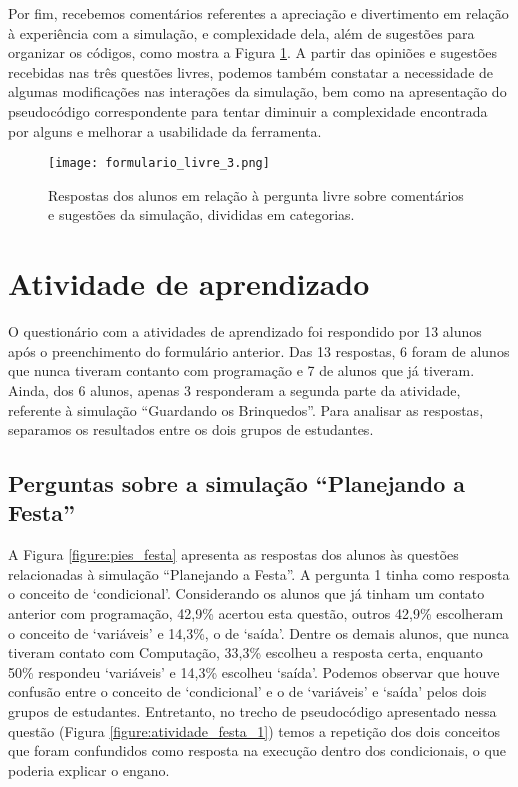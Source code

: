 Por fim, recebemos comentários referentes a apreciação e divertimento em relação à experiência com a simulação, e complexidade dela, além de sugestões para organizar os códigos, como mostra a Figura \ref{figure:livre_3}. A partir das opiniões e sugestões recebidas nas três questões livres, podemos também constatar a necessidade de algumas modificações nas interações da simulação, bem como na apresentação do pseudocódigo correspondente para tentar diminuir a complexidade encontrada por alguns e melhorar a usabilidade da ferramenta.

\begin{figure}[h!]
    \centering
    \texttt{[image: formulario\_livre\_3.png]}
    \caption{Respostas dos alunos em relação à pergunta livre sobre comentários e sugestões da simulação, divididas em categorias.}
    \label{figure:livre_3}
\end{figure}

\section{Atividade de aprendizado}

O questionário com a atividades de aprendizado foi respondido por 13 alunos após o preenchimento do formulário anterior. Das 13 respostas, 6 foram de alunos que nunca tiveram contanto com programação e 7 de alunos que já tiveram. Ainda, dos 6 alunos, apenas 3 responderam a segunda parte da atividade, referente à simulação \enquote{Guardando os Brinquedos}. Para analisar as respostas, separamos os resultados entre os dois grupos de estudantes.

\subsection{Perguntas sobre a simulação \enquote{Planejando a Festa}}

A Figura \ref{figure:pies_festa} apresenta as respostas dos alunos às questões relacionadas à simulação \enquote{Planejando a Festa}. A pergunta 1 tinha como resposta o conceito de \enquote*{condicional}. Considerando os alunos que já tinham um contato anterior com programação, 42,9\% acertou esta questão, outros 42,9\% escolheram o conceito de \enquote*{variáveis} e 14,3\%, o de \enquote*{saída}. Dentre os demais alunos, que nunca tiveram contato com Computação, 33,3\% escolheu a resposta certa, enquanto 50\% respondeu \enquote*{variáveis} e 14,3\% escolheu \enquote*{saída}. Podemos observar que houve confusão entre o conceito de \enquote*{condicional} e o de \enquote*{variáveis} e \enquote*{saída} pelos dois grupos de estudantes. Entretanto, no trecho de pseudocódigo apresentado nessa questão (Figura \ref{figure:atividade_festa_1}) temos a repetição dos dois conceitos que foram confundidos como resposta na execução dentro dos condicionais, o que poderia explicar o engano.

